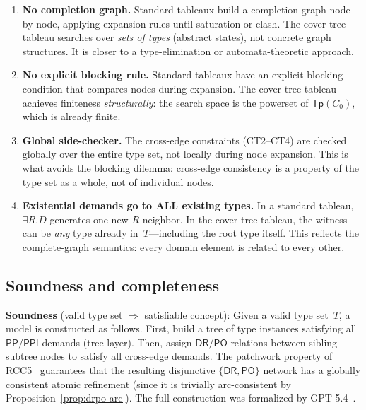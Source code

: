 \documentclass[
]{ceurart}
\theoremstyle{definition}
\newcommand{\DR}{\ensuremath{\mathsf{DR}}}
\newcommand{\PO}{\ensuremath{\mathsf{PO}}}
\newcommand{\PP}{\ensuremath{\mathsf{PP}}}
\newcommand{\PPI}{\ensuremath{\mathsf{PPI}}}
\newcommand{\Tp}{\ensuremath{\mathsf{Tp}}}
\begin{document}
\begin{enumerate}
  \item \textbf{No completion graph.}  Standard tableaux build a
    completion graph node by node, applying expansion rules until
    saturation or clash.  The cover-tree tableau searches over
    \emph{sets of types} (abstract states), not concrete graph
    structures.  It is closer to a type-elimination or
    automata-theoretic approach.

  \item \textbf{No explicit blocking rule.}  Standard tableaux
    have an explicit blocking condition that compares nodes during
    expansion.  The cover-tree tableau achieves finiteness
    \emph{structurally}: the search space is the powerset of
    $\Tp(C_0)$, which is already finite.

  \item \textbf{Global side-checker.}  The cross-edge constraints
    (CT2--CT4) are checked globally over the entire type set,
    not locally during node expansion.  This is what avoids the
    blocking dilemma: cross-edge consistency is a property of
    the type set as a whole, not of individual nodes.

  \item \textbf{Existential demands go to ALL existing types.}
    In a standard tableau, $\exists R.D$ generates one new
    $R$-neighbor.  In the cover-tree tableau, the witness can
    be \emph{any} type already in~$T$---including the root type
    itself.  This reflects the complete-graph semantics: every
    domain element is related to every other.
\end{enumerate}

\subsection{Soundness and completeness}

\textbf{Soundness} (valid type set $\Rightarrow$ satisfiable concept):
Given a valid type set~$T$, a model is constructed as follows.
First, build a tree of type instances satisfying all $\PP/\PPI$
demands (tree layer).
Then, assign $\DR/\PO$ relations between sibling-subtree nodes
to satisfy all cross-edge demands.
The patchwork property of RCC5~\cite{RenzNebel1999} guarantees
that the resulting disjunctive $\{\DR,\PO\}$ network has a
globally consistent atomic refinement (since it is trivially
arc-consistent by Proposition~\ref{prop:drpo-arc}).
The full construction was formalized by GPT-5.4~\cite{SiblingCompleted}.
\end{document}
